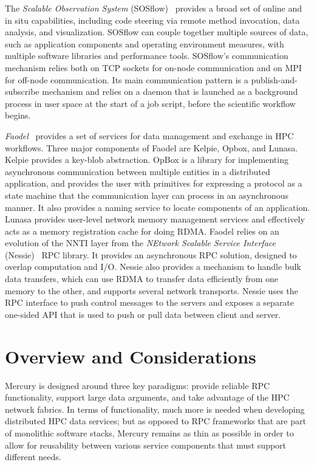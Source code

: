 \documentclass[11pt]{article}
\begin{document}
The \textit{Scalable Observation System} (SOSflow)~\cite{Wood2016} provides a broad
set of online and in situ capabilities, including code steering via remote method
invocation, data analysis, and visualization. SOSflow can couple together
multiple sources of data, such as application components and operating
environment measures, with multiple software libraries and performance
tools. SOSflow's communication mechanism relies both on TCP sockets for
on-node communication and on MPI for off-node communication. Its main communication
pattern is a publish-and-subscribe mechanism and relies on a daemon that is
launched as a background  process  in  user space at the start of a
job script, before the scientific workflow begins.

\textit{Faodel}~\cite{Ulmer2018} provides a set of services for data
management and exchange in HPC workflows. Three major components of
Faodel are Kelpie, Opbox, and Lunasa. Kelpie provides a key-blob
abstraction. OpBox is a library for implementing asynchronous communication
between multiple entities in a distributed application, and provides the user
with primitives for expressing a protocol as a state machine that the
communication layer can process in an asynchronous manner. It also provides
a naming service to locate components of an application. Lunasa provides
user-level network memory management services and effectively
acts as a memory registration cache for doing RDMA. Faodel relies on
an evolution of the NNTI layer from the \textit{NEtwork Scalable
Service Interface} (Nessie)~\cite{Lofstead2011} RPC library.
It provides an asynchronous RPC solution, designed to overlap computation and
I/O. Nessie also provides a mechanism to handle bulk data transfers, which can use
RDMA to transfer data efficiently from one memory to the other, and supports
several network transports. Nessie uses the RPC interface to push
control messages to the servers and exposes a separate one-sided API that is
used to push or pull data between client and server.

\section{Overview and Considerations}
\label{sec:overview}

Mercury is designed around three key paradigms: provide reliable RPC
functionality, support large data arguments, and take advantage of the HPC network
fabrics. In terms of functionality, much more is needed when
developing distributed HPC data services; but as opposed to RPC frameworks that are
part of monolithic software stacks, Mercury remains as thin as possible
in order to allow for reusability between various service components that must
support different needs.
\end{document}
